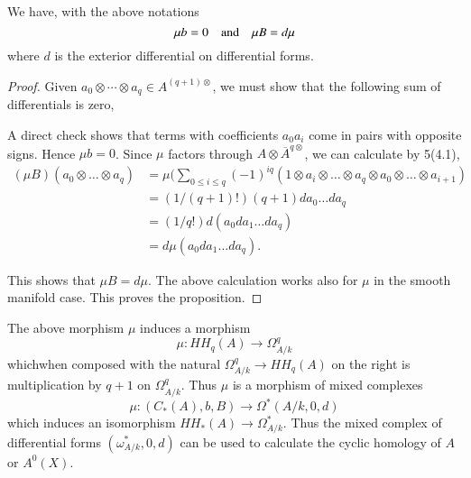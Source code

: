 \begin{proposition}\label{chap6-prop5.3}
We have, with the above notations
$$
\mu b=0\quad\text{and}\quad \mu B=d\mu
$$
where $d$ is the exterior differential on differential forms.
\end{proposition}

\begin{proof}
Given $a_{0}\otimes\cdots\otimes a_{q}\in A^{(q+1)\otimes}$, we must
show that the following sum of differentials is zero,
{}

A direct check shows that terms with coefficients $a_{0}a_{i}$ come in
pairs with opposite signs. Hence $\mu b=0$. Since $\mu$ factors
through $A\otimes \overline{A}^{q\otimes}$, we can calculate by
5(4.1),
\begin{align*}
(\mu B)(a_{0}\otimes\ldots\otimes a_{q}) &= \mu(\sum_{0\leq i\leq
    q}(-1)^{iq}(1\otimes a_{i}\otimes\ldots\otimes a_{q}\otimes
  a_{0}\otimes \ldots \otimes a_{i+1})\\
&= (1/(q+1)!)(q+1)da_{0}\ldots da_{q}\\
&= (1/q!)d(a_{0}da_{1}\ldots da_{q})\\
&= d\mu(a_{0}da_{1}\ldots da_{q}).
\end{align*}

This shows that $\mu B=d\mu$. The above calculation works also for
$\mu$ in the smooth manifold case. This proves the proposition.
\end{proof}

\begin{remark}\label{chap6-rem5.4}
The above morphism $\mu$ induces a morphism
$$
\mu:HH_{q}(A)\to \Omega^{q}_{A/k}
$$
which\pageoriginale when composed with the natural
$\Omega^{q}_{A/k}\to HH_{q}(A)$ on the right is multiplication by
$q+1$ on $\Omega^{q}_{A/k}$. Thus $\mu$ is a morphism of mixed
complexes
$$
\mu:(C_{\ast}(A),b,B)\to \Omega^{\ast}(A/k,0,d)
$$
which induces an isomorphism $HH_{\ast}(A)\to \Omega^{*}_{A/k}$. Thus
the mixed complex of differential forms $(\omega^{*}_{A/k},0,d)$ can
be used to calculate the cyclic homology of $A$ or $A^{0}(X)$.
\end{remark}

